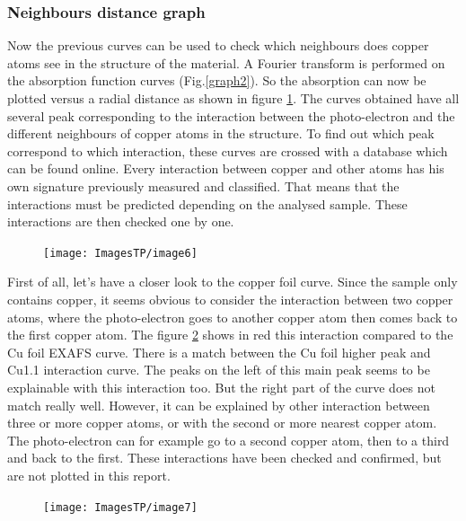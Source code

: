 \documentclass[11pt,a4paper,oneside]{article}
\begin{document}
\subsubsection{Neighbours distance graph}
Now the previous curves can be used to check which neighbours does copper atoms see in the structure of the material. A Fourier transform is performed on the absorption function curves (Fig.\ref{graph2}). So the absorption can now be plotted versus a radial distance as shown in figure \ref{graph3}. The curves obtained have all several peak corresponding to the interaction between the photo-electron and the different neighbours of copper atoms in the structure. To find out which peak correspond to which interaction, these curves are crossed with a database which can be found online. Every interaction between copper and other atoms has his own signature previously measured and classified. That means that the interactions must be predicted depending on the analysed sample. These interactions are then checked one by one.



\begin{figure}[h]
    \begin{center}
        \texttt{[image: ImagesTP/image6]}
        \caption{}
        \label{graph3}
    \end{center}
\end{figure}


First of all, let’s have a closer look to the copper foil curve. Since the sample only contains copper, it seems obvious to consider the interaction between two copper atoms, where the photo-electron goes to another copper atom then comes back to the first copper atom. The figure \ref{graph4} shows in red this interaction compared to the Cu foil EXAFS curve. There is a match between the Cu foil higher peak and Cu1.1 interaction curve. The peaks on the left of this main peak seems to be explainable with this interaction too. But the right part of the curve does not match really well. However, it can be explained by other interaction between three or more copper atoms, or with the second or more nearest copper atom. The photo-electron can for example go to a second copper atom, then to a third and back to the first. These interactions have been checked and confirmed, but are not plotted in this report.

\begin{figure}[h]
    \begin{center}
        \texttt{[image: ImagesTP/image7]}
        \caption{}
        \label{graph4}
    \end{center}
\end{figure}
\end{document}
